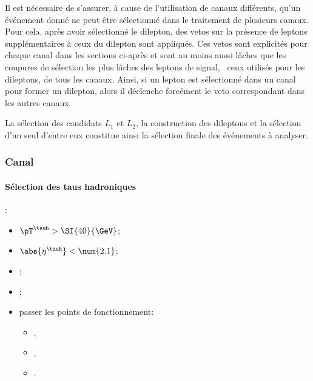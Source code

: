 \par
Il est nécessaire de s'assurer, à cause de l'utilisation de canaux différents, qu'un événement donné ne peut être sélectionné dans le traitement de plusieurs canaux.
Pour cela, après avoir sélectionné le dilepton, des vetos sur la présence de leptons supplémentaires à ceux du dilepton sont appliqués.
Ces vetos sont explicités pour chaque canal dans les sections ci-après et sont au moins aussi lâches que les coupures de sélection les plus lâches des leptons de signal, \ie\ ceux utilisés pour les dileptons, de tous les canaux.
Ainsi, si un lepton est sélectionné dans un canal pour former un dilepton, alors il déclenche forcément le veto correspondant dans les autres canaux.
\par
La sélection des candidats $L_1$ et $L_2$, la construction des dileptons et la sélection d'un seul d'entre eux constitue ainsi la sélection finale des événements à analyser.

\subsubsection{Canal \tauh\tauh}\label{chapter-HTT_analysis-section-offline-tt}
\paragraph{Sélection des taus hadroniques}
:
\begin{itemize}
    \item $\pT^{\tauh} > \SI{40}{\GeV}$;
    \item $\abs{\eta^{\tauh}} < \num{2.1}$;
    \item \TauHdz;
    \item \NewDecayModeFinding[footnote];
    \item passer les points de fonctionnement:
        \begin{itemize}
            \item {},
            \item {},
            \item {}.
        \end{itemize}
\end{itemize}
